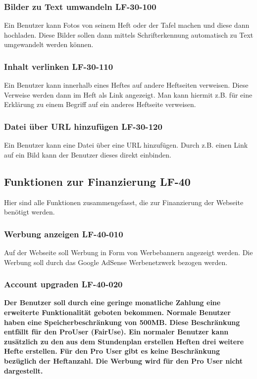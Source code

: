 \documentclass[12pt,a4paper,oneside,ngerman]{scrartcl}
\begin{document}
\subsubsection{Bilder zu Text umwandeln \hfill LF-30-100}
Ein Benutzer kann Fotos von seinem Heft oder der Tafel machen und diese dann hochladen. Diese Bilder sollen dann mittels Schrifterkennung automatisch zu Text umgewandelt werden können.

\subsubsection{Inhalt verlinken \hfill LF-30-110}
Ein Benutzer kann innerhalb eines Heftes auf andere Heftseiten verweisen. Diese Verweise werden dann im Heft als Link angezeigt. Man kann hiermit z.B. für eine Erklärung zu einem Begriff auf ein anderes Heftseite verweisen. 

\subsubsection{Datei über URL hinzufügen \hfill LF-30-120}
Ein Benutzer kann eine Datei über eine URL hinzufügen. Durch z.B. einen Link auf ein Bild kann der Benutzer dieses direkt einbinden. 


\subsection[Funktionen zur Finanzierung]{Funktionen zur Finanzierung \hfill LF-40}
Hier sind alle Funktionen zusammengefasst, die zur Finanzierung der Webseite benötigt werden.

\subsubsection{Werbung anzeigen \hfill LF-40-010}
Auf der Webseite soll Werbung in Form von Werbebannern angezeigt werden. Die Werbung soll durch das Google AdSense Werbenetzwerk bezogen werden.

\subsubsection{Account upgraden \hfill LF-40-020}
\textbf{Der Benutzer soll durch eine geringe monatliche Zahlung eine erweiterte Funktionalität geboten bekommen. Normale Benutzer haben eine Speicherbeschränkung von 500MB. Diese Beschränkung entfällt für den \gls{ProUser} (\gls{FairUse}). Ein normaler Benutzer kann zusätzlich zu den aus dem Stundenplan erstellen Heften drei weitere Hefte erstellen. Für den Pro User gibt es keine Beschränkung bezüglich der Heftanzahl. Die Werbung wird für den Pro User nicht dargestellt.}
\end{document}

